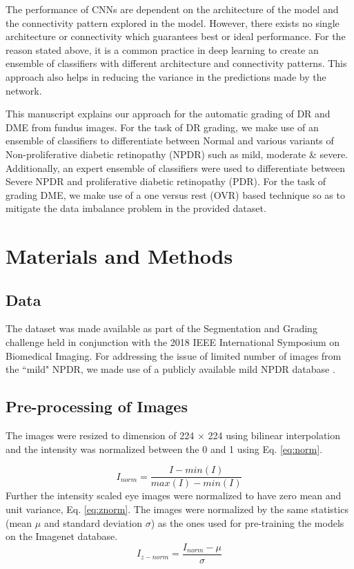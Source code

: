 \documentclass{paper}
\begin{document}
\par The performance of CNNs are dependent on the architecture of the model and the connectivity pattern explored in the model. However, there exists no single architecture or connectivity which guarantees best or ideal performance. For the reason stated above, it is a common practice in deep learning to create an ensemble of classifiers with different architecture and connectivity patterns. This approach also helps in reducing the variance in the predictions made by the network. 

\par This manuscript explains our approach for the automatic grading of DR and DME from fundus images. For the task of DR grading, we make use of an ensemble of classifiers to differentiate between Normal and various variants of Non-proliferative diabetic retinopathy (NPDR) such as mild, moderate  \& severe. Additionally, an expert ensemble of classifiers were used to differentiate between Severe NPDR and proliferative diabetic retinopathy (PDR). For the task of grading DME, we make use of a one versus rest (OVR) based technique so as to mitigate the data imbalance problem in the provided dataset.


\section{Materials and Methods}

\subsection{Data}
The dataset \cite{IRID} was made available as part of the Segmentation and Grading challenge held in conjunction with the 2018 IEEE International Symposium on Biomedical Imaging. For addressing the issue of limited number of images from the ``mild" NPDR, we made use of a publicly available  mild NPDR database \cite{Additional_Data}.

\subsection{Pre-processing of Images}
The images were resized to dimension of 224 $\times$ 224 using bilinear interpolation and the intensity was normalized between the 0 and 1 using Eq. \ref{eq:norm}.

\begin{equation}
\label{eq:norm}
I_{norm} = \frac{I- min(I)}{max(I)- min(I)}
\end{equation}
Further the intensity scaled eye images were normalized to have zero mean and unit variance, Eq. \ref{eq:znorm}. The images were normalized by the same statistics (mean $\mu$ and standard deviation $\sigma$) as the ones used for pre-training the models on the Imagenet database.
\begin{equation}
\label{eq:znorm}
I_{z-norm} = \frac{I_{norm}- \mu}{\sigma}
\end{equation}
\end{document}
